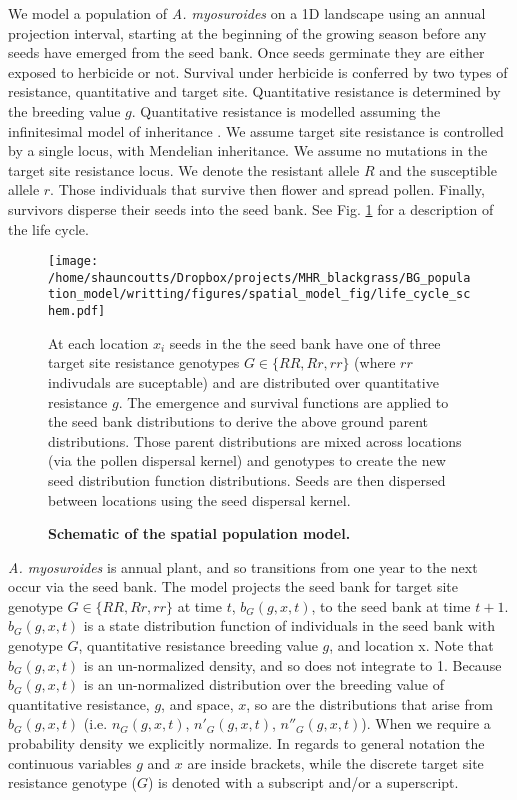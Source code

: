 \documentclass[10pt,letterpaper]{article}
\begin{document}
We model a population of \textit{A. myosuroides} on a 1D landscape using an annual projection interval, starting at the beginning of the growing season before any seeds have emerged from the seed bank. Once seeds germinate they are either exposed to herbicide or not. Survival under herbicide is conferred by two types of resistance, quantitative and target site. Quantitative resistance is determined by the breeding value $g$. Quantitative resistance is modelled assuming the infinitesimal model of inheritance \cite{Fish1918}. We assume target site resistance is controlled by a single locus, with Mendelian inheritance. We assume no mutations in the target site resistance locus. We denote the resistant allele $R$ and the susceptible allele $r$. Those individuals that survive then flower and spread pollen. Finally, survivors disperse their seeds into the seed bank. See Fig. \ref{fig:schematic} for a description of the life cycle.  

\begin{figure}[!h]
	\centering
	\texttt{[image: /home/shauncoutts/Dropbox/projects/MHR\_blackgrass/BG\_population\_model/writting/figures/spatial\_model\_fig/life\_cycle\_schem.pdf]}
\caption{\bf Schematic of the spatial population model.} At each location $x_i$ seeds in the the seed bank have one of three target site resistance genotypes $G \in \{RR, Rr, rr\}$ (where $rr$ indivudals are suceptable) and are distributed over quantitative resistance $g$. The emergence and survival functions are applied to the seed bank distributions to derive the above ground parent distributions. Those parent distributions are mixed across locations (via the pollen dispersal kernel) and genotypes to create the new seed distribution function distributions. Seeds are then dispersed between locations using the seed dispersal kernel. \label{fig:schematic}
\end{figure}

\textit{A. myosuroides} is annual plant, and so transitions from one year to the next occur via the seed bank. The model projects the seed bank for target site genotype $G \in \{RR, Rr, rr\}$ at time $t$, $b_G(g, x, t)$, to the seed bank at time $t+1$. $b_G(g, x, t)$ is a state distribution function of individuals in the seed bank with genotype $G$, quantitative resistance breeding value $g$, and location x. Note that $b_G(g, x, t)$ is an un-normalized density, and so does not integrate to 1. Because $b_G(g, x, t)$ is an un-normalized distribution over the breeding value of quantitative resistance, $g$, and space, $x$, so are the distributions that arise from $b_G(g, x, t)$ (i.e. $n_G(g, x, t)$, $n'_G(g, x, t)$, $n''_G(g, x, t)$). When we require a probability density we explicitly normalize. In regards to general notation the continuous variables $g$ and $x$ are inside brackets, while the discrete target site resistance genotype ($G$) is denoted with a subscript and/or a superscript.    
\end{document}
